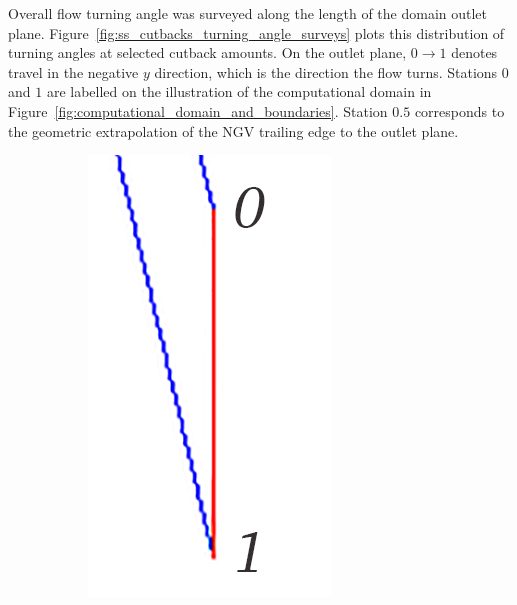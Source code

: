 \documentclass[a4paper, 11pt, oneside]{report}
\begin{document}
Overall flow turning angle was surveyed along the length of the domain outlet plane. Figure~\ref{fig:ss_cutbacks_turning_angle_surveys} plots this distribution of turning angles at selected cutback amounts. On the outlet plane, $0\rightarrow1$ denotes travel in the negative $y$ direction, which is the direction the flow turns. Stations $0$ and $1$ are labelled on the illustration of the computational domain in Figure~\ref{fig:computational_domain_and_boundaries}. Station $0.5$ corresponds to the geometric extrapolation of the NGV trailing edge to the outlet plane.

\begin{figure}[H]
	\centering
	\begin{subfigure}{.125\textwidth}
		\centering
		\includegraphics[width=\linewidth]{figs/outlet_minifigure.png}

\end{subfigure}
\end{figure}
\end{document}
